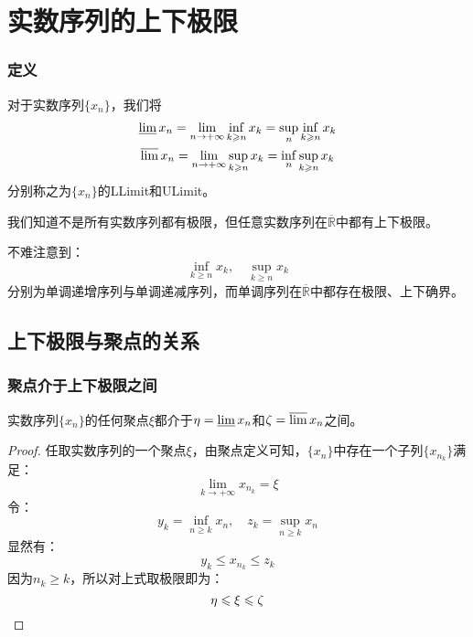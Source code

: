 \section{实数序列的上下极限}
\subsubsection{定义}
\begin{definition}
	对于实数序列$\{x_n\}$，我们将
	\begin{gather*}
		\varliminf x_n=\lim_{n\to+\infty}\inf_{k\geqslant n}x_k=\sup_n\inf_{k\geqslant n}x_k \\
		\varlimsup x_n=\lim_{n\to+\infty}\sup_{k\geqslant n}x_k=\inf_n\sup_{k\geqslant n}x_k
	\end{gather*}
	分别称之为$\{x_n\}$的\gls{LLimit}和\gls{ULimit}。
\end{definition}
我们知道不是所有实数序列都有极限，但任意实数序列在$\overline{\mathbb{R}}$中都有上下极限。\par
不难注意到：
\begin{equation*}
	\inf_{k\geqslant n}x_k,\quad
	\sup_{k\geqslant n}x_k
\end{equation*}
分别为单调递增序列与单调递减序列，而单调序列在$\overline{\mathbb{R}}$中都存在极限、上下确界。

\subsection{上下极限与聚点的关系}
\subsubsection{聚点介于上下极限之间}
\begin{theorem}
	实数序列$\{x_n\}$的任何聚点$\xi$都介于$\eta=\varliminf x_n$和$\zeta=\varlimsup x_n$之间。
\end{theorem}
\begin{proof}
	任取实数序列的一个聚点$\xi$，由聚点定义可知，$\{x_n\}$中存在一个子列$\{x_{n_k}\}$满足：
	\begin{equation*}
		\lim_{k\to+\infty} x_{n_k}=\xi
	\end{equation*}
	令：
	\begin{equation*}
		y_k=\inf_{n\geqslant k}x_n,\quad
		z_k=\sup_{n\geqslant k}x_n
	\end{equation*}
	显然有：
	\begin{equation*}
		y_k\leqslant x_{n_k}\leqslant z_k
	\end{equation*}
	因为$n_k\geqslant k$，所以对上式取极限即为：
	\begin{equation*}
		\eta\leqslant\xi\leqslant\zeta\qedhere
	\end{equation*}
\end{proof}
